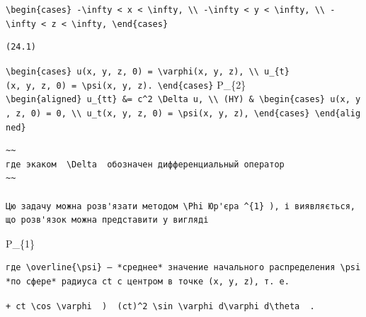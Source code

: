 \documentclass[
  ukrainian,
]{article}
\begin{document}
\texttt{\textbackslash{}begin\{cases\}\ -\textbackslash{}infty\ \textless{}\ x\ \textless{}\ \textbackslash{}infty,\ \textbackslash{}\textbackslash{}\ -\textbackslash{}infty\ \textless{}\ y\ \textless{}\ \textbackslash{}infty,\ \textbackslash{}\textbackslash{}\ -\textbackslash{}infty\ \textless{}\ z\ \textless{}\ \textbackslash{}infty,\ \textbackslash{}end\{cases\}}

\begin{verbatim}
(24.1)
\end{verbatim}

\texttt{\textbackslash{}begin\{cases\}\ u(x,\ y,\ z,\ 0)\ =\ \textbackslash{}varphi(x,\ y,\ z),\ \textbackslash{}\textbackslash{}\ u\_\{t\}(x,\ y,\ z,\ 0)\ =\ \textbackslash{}psi(x,\ y,\ z).\ \textbackslash{}end\{cases\}}
P\_\{2\}
\texttt{\textbackslash{}begin\{aligned\}\ u\_\{tt\}\ \&=\ c\^{}2\ \textbackslash{}Delta\ u,\ \textbackslash{}\textbackslash{}\ (HY)\ \&\ \textbackslash{}begin\{cases\}\ u(x,\ y,\ z,\ 0)\ =\ 0,\ \textbackslash{}\textbackslash{}\ u\_t(x,\ y,\ z,\ 0)\ =\ \textbackslash{}psi(x,\ y,\ z),\ \textbackslash{}end\{cases\}\ \textbackslash{}end\{aligned\}}

\begin{verbatim}
~~
где экаком  \Delta  обозначен дифференциальный оператор
~~

Цю задачу можна розв'язати методом \Phi Юр'єра ^{1} ), і виявляється, що розв'язок можна представити у вигляді
\end{verbatim}

P\_\{1\}

\begin{verbatim}
где \overline{\psi} — *среднее* значение начального распределения \psi *по сфере* радиуса ct с центром в точке (x, y, z), т. е.
\end{verbatim}

\texttt{+\ ct\ \textbackslash{}cos\ \textbackslash{}varphi\ \ )\ \ (ct)\^{}2\ \textbackslash{}sin\ \textbackslash{}varphi\ d\textbackslash{}varphi\ d\textbackslash{}theta\ \ .}
\end{document}
